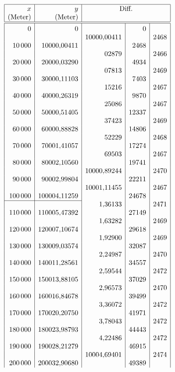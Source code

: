 {\small\renewcommand{\arraystretch}{.60}
\[\begin{array}{|r|r|r|r|r|}\hline
\rule{0pt}{2.1ex}x&y&\multicolumn{3}{c|}{\text{Diff.}}\\
\rule[-3.6pt]{0pt}{3.6pt}\text{(Meter)}&\text{(Meter)}&\multicolumn{3}{c|}{}\\\hline\hline
\rule{0pt}{2.5ex}0&0&&0&\\
&&10000{,}00411&&2468\\
10\,000&10000{,}00411&&2468&\\
&&02879&&2466\\
20\,000&20000{,}03290&&4934&\\
&&07813&&2469\\
30\,000&30000{,}11103&&7403&\\
&&15216&&2467\\
40\,000&40000{,}26319&&9870&\\
&&25086&&2467\\
50\,000&50000{,}51405&&12337&\\
&&37423&&2469\\
60\,000&60000{,}88828&&14806&\\
&&52229&&2468\\
70\,000&70001{,}41057&&17274&\\
&&69503&&2467\\
80\,000&80002{,}10560&&19741&\\
&&10000{,}89244&&2470\\
90\,000&90002{,}99804&&22211&\\
&&10001{,}11455&&2467\\
100\,000&100004{,}11259&&24678&\\
\cline{1-2}
&&1{,}36133&&2471\\
110\,000&110005{,}47392&&27149&\\
&&1{,}63282&&2469\\
120\,000&120007{,}10674&&29618&\\
&&1{,}92900&&2469\\
130\,000&130009{,}03574&&32087&\\
&&2{,}24987&&2470\\
140\,000&140011{,}28561&&34557&\\
&&2{,}59544&&2472\\
150\,000&150013{,}88105&&37029&\\
&&2{,}96573&&2470\\
160\,000&160016{,}84678&&39499&\\
&&3{,}36072&&2472\\
170\,000&170020{,}20750&&41971&\\
&&3{,}78043&&2472\\
180\,000&180023{,}98793&&44443&\\
&&4{,}22486&&2472\\
190\,000&190028{,}21279&&46915&\\
&&10004{,}69401&&2474\\
200\,000&200032{,}90680&&49389&\\
\end{array}\]
}


